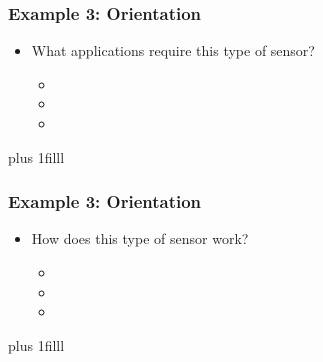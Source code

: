 \documentclass[fleqn]{beamer} %
\newcommand{\sectionIsubsectionIVtitle}{Example 3: Orientation}
\newcommand{\btVFill}{\vskip0pt plus 1filll}
\begin{document}
			\begin{frame}
				\frametitle{\sectionIsubsectionIVtitle}

				\begin{itemize}
					\item What applications require this type of sensor?
					\begin{itemize}
						\item \vspace{5mm}
						\item \vspace{5mm}
						\item \vspace{5mm}	
					\end{itemize}
				\end{itemize}
				
				\btVFill
			\end{frame}

			\begin{frame}
				\frametitle{\sectionIsubsectionIVtitle}
				\begin{itemize}
					\item How does this type of sensor work?
					\begin{itemize}
						\item \vspace{5mm}
						\item \vspace{5mm}
						\item \vspace{5mm}	
					\end{itemize}
				\end{itemize}
				
				\btVFill

			\end{frame}


\end{document}
